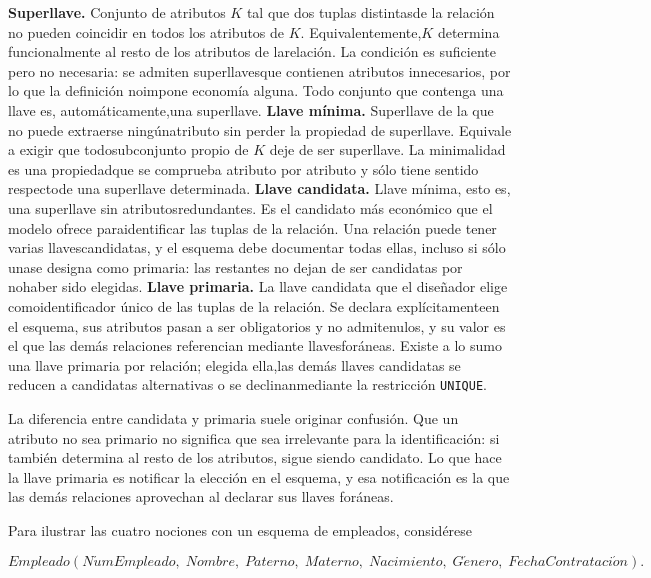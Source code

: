 \medskip
\noindent\textbf{Superllave.} Conjunto de atributos $K$ tal que dos tuplas
  distintasde la relación no pueden coincidir en todos los atributos de $K$.
  Equivalentemente,$K$ determina funcionalmente al resto de los atributos de
  larelación. La condición es suficiente pero no necesaria: se admiten
  superllavesque contienen atributos innecesarios, por lo que la definición
  noimpone economía alguna. Todo conjunto que contenga una llave es,
  automáticamente,una superllave.
\medskip
\noindent\textbf{Llave mínima.} Superllave de la que no puede extraerse
  ningúnatributo sin perder la propiedad de superllave. Equivale a exigir que
  todosubconjunto propio de $K$ deje de ser superllave. La minimalidad es una
  propiedadque se comprueba atributo por atributo y sólo tiene sentido
  respectode una superllave determinada.
\medskip
\noindent\textbf{Llave candidata.} Llave mínima, esto es, una superllave sin
  atributosredundantes. Es el candidato más económico que el modelo ofrece
  paraidentificar las tuplas de la relación. Una relación puede tener varias
  llavescandidatas, y el esquema debe documentar todas ellas, incluso si sólo
  unase designa como primaria: las restantes no dejan de ser candidatas por
  nohaber sido elegidas.
\medskip
\noindent\textbf{Llave primaria.} La llave candidata que el diseñador elige
  comoidentificador único de las tuplas de la relación. Se declara
  explícitamenteen el esquema, sus atributos pasan a ser obligatorios y no
  admitenulos, y su valor es el que las demás relaciones referencian mediante
  llavesforáneas. Existe a lo sumo una llave primaria por relación; elegida
  ella,las demás llaves candidatas se reducen a candidatas alternativas o se
  declinanmediante la restricción \texttt{UNIQUE}.

La diferencia entre candidata y primaria suele originar confusión. Que un
atributo no sea primario no significa que sea irrelevante para la
identificación: si también determina al resto de los atributos, sigue siendo
candidato. Lo que hace la llave primaria es notificar la elección en el
esquema, y esa notificación es la que las demás relaciones aprovechan al
declarar sus llaves foráneas.

Para ilustrar las cuatro nociones con un esquema de empleados, considérese

\begin{equation}
  \mathit{Empleado}(\mathit{N\acute{u}mEmpleado},\;
  \mathit{Nombre},\; \mathit{Paterno},\; \mathit{Materno},\;
  \mathit{Nacimiento},\; \mathit{G\acute{e}nero},\;
  \mathit{FechaContrataci\acute{o}n}).
\end{equation}

